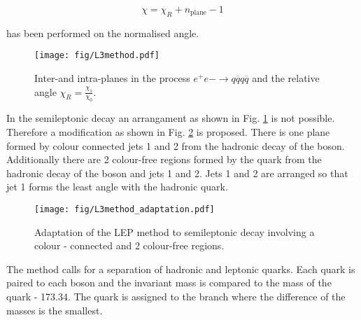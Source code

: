 \begin{equation}
  \chi=\chi_{R} + n_{\text{plane}} - 1
\end{equation}

has been performed on the normalised angle. 

\begin{figure}[hbtp]
  \centering
  \texttt{[image: fig/L3method.pdf]}
  \caption{Inter-\PW and intra-\PW planes in the process $e^{+}e{-}\rightarrow q\overline{q}q\overline{q}$ and the relative angle $\chi_{R}=\frac{\chi_{1}}{\chi_{0}}$.}
  \label{fig:LEP_method}
\end{figure}

In the \ttbar semileptonic decay an arrangament as shown in Fig. \ref{fig:LEP_method} is not possible. Therefore a modification as shown in Fig. \ref{fig:LEP_method_adaptation} is proposed. There is one plane formed by colour connected jets 1 and 2 from the hadronic decay of the \PW boson. Additionally there are 2 colour-free regions formed by the \cPqb quark from the hadronic decay of the \PW boson and jets 1 and 2. Jets 1 and 2 are arranged so that jet 1 forms the least angle with the hadronic \cPqb quark. 

\begin{figure}[hbtp]
  \centering
  \texttt{[image: fig/L3method\_adaptation.pdf]}
  \caption{Adaptation of the LEP method to \ttbar semileptonic decay involving a colour - connected and 2 colour-free regions.}
  \label{fig:LEP_method_adaptation}
\end{figure}

The method calls for a separation of hadronic and leptonic \cPqb quarks. Each \cPqb quark is paired to each \PW boson and the invariant mass is compared to the mass of the \cPqt quark - 173.34\GeV. The \cPqb quark is assigned to the branch where the difference of the masses is the smallest. 

